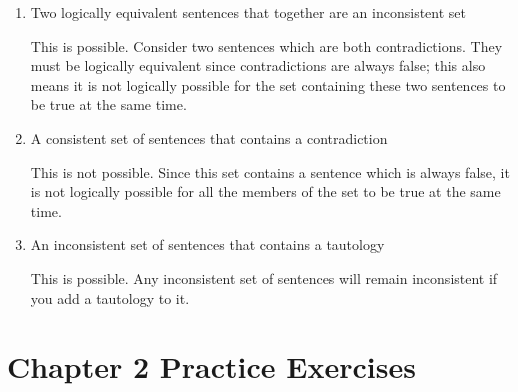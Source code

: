 \documentclass[12pt, letterpaper, twoside]{article}
\begin{document}
\begin{enumerate}
    \item Two logically equivalent sentences that together
      are an inconsistent set

    This is possible. Consider two sentences which are both
    contradictions. They must be logically equivalent since
    contradictions are always false; this also means it is
    not logically possible for the set containing these two
    sentences to be true at the same time.

    \item A consistent set of sentences that contains a
      contradiction

    This is not possible. Since this set contains a sentence
    which is always false, it is not logically possible for
    all the members of the set to be true at the same time.

    \item An inconsistent set of sentences that contains a
      tautology

    This is possible. Any inconsistent set of sentences will
    remain inconsistent if you add a tautology to it.

\end{enumerate}

\section{Chapter 2 Practice Exercises}
 
\end{document}
